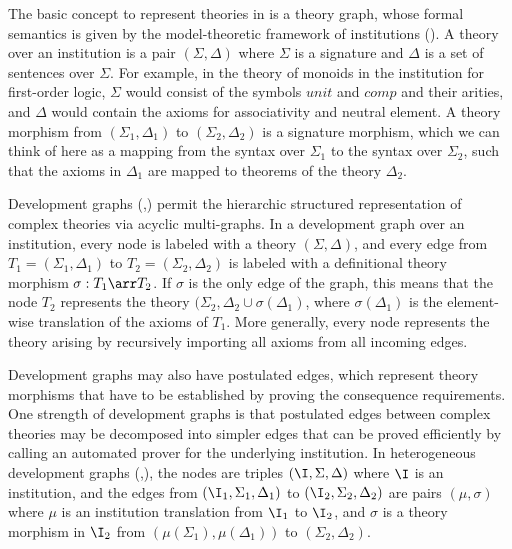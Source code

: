 \documentclass{entcs}
\begin{document}
The basic concept to represent theories in {\omdoc} is a theory graph, whose formal semantics is given by the model-theoretic framework of institutions (\cite{institutions}). A theory over an institution is a pair $(\Sigma,\Delta)$ where $\Sigma$ is a signature and $\Delta$ is a set of sentences over $\Sigma$. For example, in the theory of monoids in the institution for first-order logic, $\Sigma$ would consist of the symbols $unit$ and $comp$ and their arities, and $\Delta$ would contain the axioms for associativity and neutral element. A theory morphism from $(\Sigma_1,\Delta_1)$ to $(\Sigma_2,\Delta_2)$ is a signature morphism, which we can think of here as a mapping from the syntax over $\Sigma_1$ to the syntax over $\Sigma_2$, such that the axioms in $\Delta_1$ are mapped to theorems of the theory $\Delta_2$.

Development graphs (\cite{devgraphs},\cite{maya}) permit the hierarchic structured representation of complex theories via acyclic multi-graphs. In a development graph over an institution, every node is labeled with a theory $(\Sigma,\Delta)$, and every edge from $T_1=(\Sigma_1,\Delta_1)$ to $T_2=(\Sigma_2,\Delta_2)$ is labeled with a definitional theory morphism $\sigma:T_1\arr T_2$. If $\sigma$ is the only edge of the graph, this means that the node $T_2$ represents the theory $(\Sigma_2,\Delta_2\cup \sigma(\Delta_1)$, where $\sigma(\Delta_1)$ is the element-wise translation of the axioms of $T_1$. More generally, every node represents the theory arising by recursively importing all axioms from all incoming edges. 

Development graphs may also have postulated edges, which represent theory morphisms that have to be established by proving the consequence requirements.  One strength of development graphs is that postulated edges between complex theories may be decomposed into simpler edges that can be proved efficiently by calling an automated prover for the underlying institution. In heterogeneous development graphs (\cite{hetdevgraphs},\cite{hets}), the nodes are triples $(\I,\Sigma,\Delta)$ where $\I$ is an institution, and the edges from $(\I_1,\Sigma_1,\Delta_1)$ to $(\I_2,\Sigma_2,\Delta_2)$ are pairs $(\mu,\sigma)$ where $\mu$ is an institution translation from $\I_1$ to $\I_2$, and $\sigma$ is a theory morphism in $\I_2$ from $(\mu(\Sigma_1),\mu(\Delta_1))$ to $(\Sigma_2,\Delta_2)$.
\end{document}
